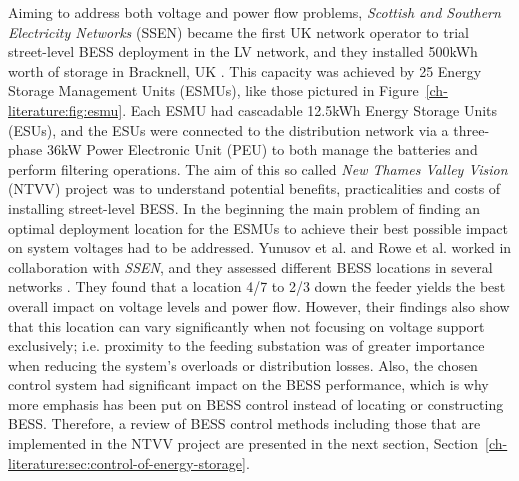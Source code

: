

Aiming to address both voltage and power flow problems, \textit{Scottish and Southern Electricity Networks} (SSEN) became the first UK network operator to trial street-level BESS deployment in the LV network, and they installed 500kWh worth of storage in Bracknell, UK \cite{SSEN2016}.
This capacity was achieved by 25 Energy Storage Management Units (ESMUs), like those pictured in Figure~\ref{ch-literature:fig:esmu}.
Each ESMU had cascadable 12.5kWh Energy Storage Units (ESUs), and the ESUs were connected to the distribution network via a three-phase 36kW Power Electronic Unit (PEU) to both manage the batteries and perform filtering operations.
The aim of this so called \textit{New Thames Valley Vision} (NTVV) project was to understand potential benefits, practicalities and costs of installing street-level BESS.
In the beginning the main problem of finding an optimal deployment location for the ESMUs to achieve their best possible impact on system voltages had to be addressed.
Yunusov et al. and Rowe et al. worked in collaboration with \textit{SSEN}, and they assessed different BESS locations in several networks \cite{Yunusov2016, Rowe2014, Rowe2014a}.
They found that a location 4/7 to 2/3 down the feeder yields the best overall impact on voltage levels and power flow.
However, their findings also show that this location can vary significantly when not focusing on voltage support exclusively; i.e. proximity to the feeding substation was of greater importance when reducing the system's overloads or distribution losses.
Also, the chosen $\text{control system}$ had significant impact on the BESS performance, which is why more emphasis has been put on BESS control instead of locating or constructing BESS.
Therefore, a review of BESS control methods including those that are implemented in the NTVV project are presented in the next section, Section~\ref{ch-literature:sec:control-of-energy-storage}.








